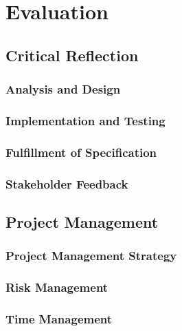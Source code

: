 \section{Evaluation}

\subsection{Critical Reflection}

\subsubsection{Analysis and Design}
\subsubsection{Implementation and Testing}


\subsubsection{Fulfillment of Specification}


\subsubsection{Stakeholder Feedback}


\subsection{Project Management}

\subsubsection{Project Management Strategy}
\subsubsection{Risk Management}
\subsubsection{Time Management}

